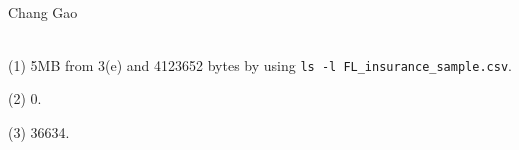 \documentclass[12pt,letterpaper]{article}
\begin{document}
	\begin{center}
		\smallskip\\
		Chang Gao\smallskip\\
	\end{center}
	\smallskip\\
	(1) 5MB from 3(e) and 4123652 bytes by using \texttt{ls -l FL\_insurance\_sample.csv}.
	
	\noindent(2) 0.
	
	\noindent(3) 36634.
\end{document}
